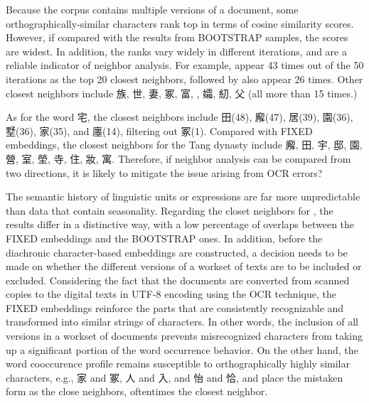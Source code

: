 Because the corpus contains multiple versions of a document, some orthographically-similar characters rank top in terms of cosine similarity scores. However, if compared with the results from \textsc{BOOTSTRAP} samples, the scores are widest. In addition, the ranks vary widely in different iterations, and are a reliable indicator of neighbor analysis. For example,  appear 43 times out of the 50 iterations as the top 20 closest neighbors, followed by  also appear 26 times. Other closest neighbors include 族, 世, 妻, 冢, 富, , 孀, 糿, 父 (all more than 15 times.)

As for the word 宅, the closest neighbors include 田(48), 廨(47), 居(39), 園(36), 墅(36), 家(35), and 廛(14), filtering out 冢(1). Compared with \textsc{FIXED} embeddings, the closest neighbors for the Tang dynasty include 廨, 田, 宇, 邸, 園, 營, 室, 塋, 寺, 住, 妝, 寓. Therefore, if neighbor analysis can be compared from two directions, it is likely to mitigate the issue arising from OCR errors?

The semantic history of linguistic units or expressions are far more unpredictable than data that contain seasonality. Regarding the closet neighbors for \jia , the results differ in a distinctive way, with a low percentage of overlaps between the \textsc{FIXED} embeddings and the \textsc{BOOTSTRAP} ones. In addition, before the diachronic character-based embeddings are constructed, a decision needs to be made on whether the different versions of a workset of texts are to be included or excluded. Considering the fact that the documents are converted from scanned copies to the digital texts in UTF-8 encoding using the OCR technique, the \textsc{FIXED} embeddings reinforce the parts that are consistently recognizable and transformed into similar strings of characters. In other words, the inclusion of all versions in a workset of documents prevents misrecognized characters from taking up a significant portion of the word occurrence behavior. On the other hand, the word cooccurence profile remains susceptible to orthographically highly similar characters, e.g., 家 and 冢, 人 and 入, and 怡 and 恰, and place the mistaken form as the close neighbors, oftentimes the closest neighbor.


